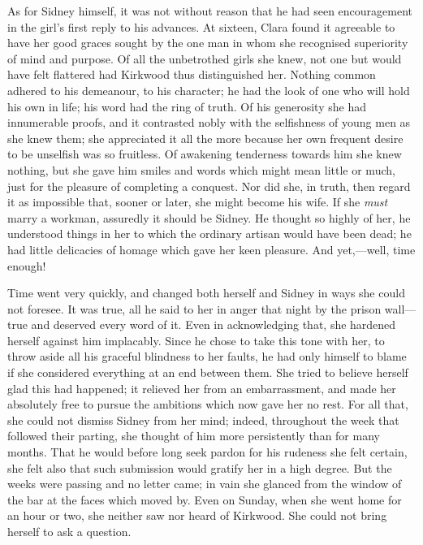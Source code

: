 As for Sidney himself, it was not without reason that he had seen
encouragement in the girl's first reply to his advances. At sixteen,
Clara found it agreeable to have her good graces sought by the one man
in whom she recognised superiority of mind and purpose. Of all the
unbetrothed girls she knew, not one but would have felt flattered had
Kirkwood thus distinguished her. Nothing common adhered to his
demeanour, to his character; he had the look of one who will hold his
own in life; his word had the ring of truth. Of his generosity she had
innumerable proofs, and it contrasted nobly with the selfishness of
young men as she knew them; she
{\protect\hypertarget{201}{}{}}appreciated it all the more because her
own frequent desire to be unselfish was so fruitless. Of awakening
tenderness towards him she knew nothing, but she gave him smiles and
words which might mean little or much, just for the pleasure of
completing a conquest. Nor did she, in truth, then regard it as
impossible that, sooner or later, she might become his wife. If she
\emph{must} marry a workman, assuredly it should be Sidney. He thought
so highly of her, he understood things in her to which the ordinary
artisan would have been dead; he had little delicacies of homage which
gave her keen pleasure. And yet,---well, time enough!

Time went very quickly, and changed both herself and Sidney in ways she
could not foresee. It was true, all he said to her in anger that night
by the prison wall---true and deserved every word of it. Even in
acknowledging that, she hardened herself against him implacably. Since
he chose to take this tone with her, to throw aside all his graceful
blindness to her faults, he had only himself to
{\protect\hypertarget{202}{}{}}blame if she considered everything at an
end between them. She tried to believe herself glad this had happened;
it relieved her from an embarrassment, and made her absolutely free to
pursue the ambitions which now gave her no rest. For all that, she could
not dismiss Sidney from her mind; indeed, throughout the week that
followed their parting, she thought of him more persistently than for
many months. That he would before long seek pardon for his rudeness she
felt certain, she felt also that such submission would gratify her in a
high degree. But the weeks were passing and no letter came; in vain she
glanced from the window of the bar at the faces which moved by. Even on
Sunday, when she went home for an hour or two, she neither saw nor heard
of Kirkwood. She could not bring herself to ask a question.

